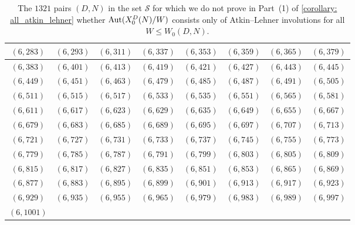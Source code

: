 \documentclass[11pt,reqno]{amsart}
\newcommand{\Aut}{{\rm Aut}}
\theoremstyle{definition}
\begin{document}
\begin{longtable}{|c|c|c|c|c|c|c|c|}
\caption{The $1321$ pairs $(D,N)$ in the set $\mathcal{S}$ for which we do not prove in Part~(1) of \cref{corollary: all_atkin_lehner} whether $\Aut(X_0^D(N)/W)$ consists only of Atkin--Lehner involutions for all $W \leq W_0(D,N)$.}\label{table: unknown_automorphism_group_stars} \\ \hline
$ ( 6 , 283 )$
 & 
$ ( 6 , 293 )$
 & 
$ ( 6 , 311 )$
 & 
$ ( 6 , 337 )$
 & 
$ ( 6 , 353 )$
 & 
$ ( 6 , 359 )$
 & 
$ ( 6 , 365 )$
 & 
$ ( 6 , 379 )$
\\ \hline
$ ( 6 , 383 )$
 & 
$ ( 6 , 401 )$
 & 
$ ( 6 , 413 )$
 & 
$ ( 6 , 419 )$
 & 
$ ( 6 , 421 )$
 & 
$ ( 6 , 427 )$
 & 
$ ( 6 , 443 )$
 & 
$ ( 6 , 445 )$
\\ \hline
$ ( 6 , 449 )$
 & 
$ ( 6 , 451 )$
 & 
$ ( 6 , 463 )$
 & 
$ ( 6 , 479 )$
 & 
$ ( 6 , 485 )$
 & 
$ ( 6 , 487 )$
 & 
$ ( 6 , 491 )$
 & 
$ ( 6 , 505 )$
\\ \hline
$ ( 6 , 511 )$
 & 
$ ( 6 , 515 )$
 & 
$ ( 6 , 517 )$
 & 
$ ( 6 , 533 )$
 & 
$ ( 6 , 535 )$
 & 
$ ( 6 , 551 )$
 & 
$ ( 6 , 565 )$
 & 
$ ( 6 , 581 )$
\\ \hline
$ ( 6 , 611 )$
 & 
$ ( 6 , 617 )$
 & 
$ ( 6 , 623 )$
 & 
$ ( 6 , 629 )$
 & 
$ ( 6 , 635 )$
 & 
$ ( 6 , 649 )$
 & 
$ ( 6 , 655 )$
 & 
$ ( 6 , 667 )$
\\ \hline
$ ( 6 , 679 )$
 & 
$ ( 6 , 683 )$
 & 
$ ( 6 , 685 )$
 & 
$ ( 6 , 689 )$
 & 
$ ( 6 , 695 )$
 & 
$ ( 6 , 697 )$
 & 
$ ( 6 , 707 )$
 & 
$ ( 6 , 713 )$
\\ \hline
$ ( 6 , 721 )$
 & 
$ ( 6 , 727 )$
 & 
$ ( 6 , 731 )$
 & 
$ ( 6 , 733 )$
 & 
$ ( 6 , 737 )$
 & 
$ ( 6 , 745 )$
 & 
$ ( 6 , 755 )$
 & 
$ ( 6 , 773 )$
\\ \hline
$ ( 6 , 779 )$
 & 
$ ( 6 , 785 )$
 & 
$ ( 6 , 787 )$
 & 
$ ( 6 , 791 )$
 & 
$ ( 6 , 799 )$
 & 
$ ( 6 , 803 )$
 & 
$ ( 6 , 805 )$
 & 
$ ( 6 , 809 )$
\\ \hline
$ ( 6 , 815 )$
 & 
$ ( 6 , 817 )$
 & 
$ ( 6 , 827 )$
 & 
$ ( 6 , 835 )$
 & 
$ ( 6 , 851 )$
 & 
$ ( 6 , 853 )$
 & 
$ ( 6 , 865 )$
 & 
$ ( 6 , 869 )$
\\ \hline
$ ( 6 , 877 )$
 & 
$ ( 6 , 883 )$
 & 
$ ( 6 , 895 )$
 & 
$ ( 6 , 899 )$
 & 
$ ( 6 , 901 )$
 & 
$ ( 6 , 913 )$
 & 
$ ( 6 , 917 )$
 & 
$ ( 6 , 923 )$
\\ \hline
$ ( 6 , 929 )$
 & 
$ ( 6 , 935 )$
 & 
$ ( 6 , 955 )$
 & 
$ ( 6 , 965 )$
 & 
$ ( 6 , 979 )$
 & 
$ ( 6 , 983 )$
 & 
$ ( 6 , 989 )$
 & 
$ ( 6 , 997 )$
\\ \hline
$ ( 6 , 1001 )$

\end{longtable}
\end{document}
